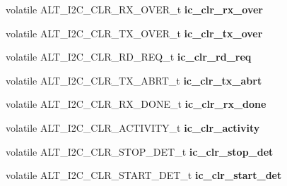 \begin{DoxyCompactItemize}
\item 
\mbox{\label{structALT__I2C__s_abc389f263235746072b72358a4f538bb}} 
volatile A\+L\+T\+\_\+\+I2\+C\+\_\+\+C\+L\+R\+\_\+\+R\+X\+\_\+\+O\+V\+E\+R\+\_\+t {\bfseries ic\+\_\+clr\+\_\+rx\+\_\+over}
\item 
\mbox{\label{structALT__I2C__s_af15926e2734f486ecef57106d2e652c1}} 
volatile A\+L\+T\+\_\+\+I2\+C\+\_\+\+C\+L\+R\+\_\+\+T\+X\+\_\+\+O\+V\+E\+R\+\_\+t {\bfseries ic\+\_\+clr\+\_\+tx\+\_\+over}
\item 
\mbox{\label{structALT__I2C__s_a8acb982df1f752ac2da7aa95e051a7a1}} 
volatile A\+L\+T\+\_\+\+I2\+C\+\_\+\+C\+L\+R\+\_\+\+R\+D\+\_\+\+R\+E\+Q\+\_\+t {\bfseries ic\+\_\+clr\+\_\+rd\+\_\+req}
\item 
\mbox{\label{structALT__I2C__s_a89348c4753607fa5914c8820dfe12ee7}} 
volatile A\+L\+T\+\_\+\+I2\+C\+\_\+\+C\+L\+R\+\_\+\+T\+X\+\_\+\+A\+B\+R\+T\+\_\+t {\bfseries ic\+\_\+clr\+\_\+tx\+\_\+abrt}
\item 
\mbox{\label{structALT__I2C__s_a40188d19448a97211c706663dfe3252b}} 
volatile A\+L\+T\+\_\+\+I2\+C\+\_\+\+C\+L\+R\+\_\+\+R\+X\+\_\+\+D\+O\+N\+E\+\_\+t {\bfseries ic\+\_\+clr\+\_\+rx\+\_\+done}
\item 
\mbox{\label{structALT__I2C__s_add6df61214b44cae851c65d0541e0613}} 
volatile A\+L\+T\+\_\+\+I2\+C\+\_\+\+C\+L\+R\+\_\+\+A\+C\+T\+I\+V\+I\+T\+Y\+\_\+t {\bfseries ic\+\_\+clr\+\_\+activity}
\item 
\mbox{\label{structALT__I2C__s_a059385ebb8c2437354cf85802d6cc94a}} 
volatile A\+L\+T\+\_\+\+I2\+C\+\_\+\+C\+L\+R\+\_\+\+S\+T\+O\+P\+\_\+\+D\+E\+T\+\_\+t {\bfseries ic\+\_\+clr\+\_\+stop\+\_\+det}
\item 
\mbox{\label{structALT__I2C__s_ae9f2b843a0c3a893cc559a1e21ded254}} 
volatile A\+L\+T\+\_\+\+I2\+C\+\_\+\+C\+L\+R\+\_\+\+S\+T\+A\+R\+T\+\_\+\+D\+E\+T\+\_\+t {\bfseries ic\+\_\+clr\+\_\+start\+\_\+det}
\item 
\mbox{\label{structALT__I2C__s_a33ae77364291c86605877f0860c25e6c}} 

\end{DoxyCompactItemize}
